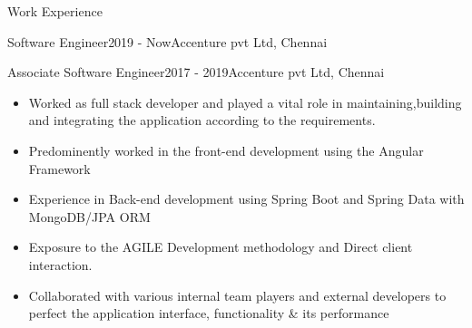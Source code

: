 \documentclass{resume} %
\begin{document}

\begin{rSection}{Work Experience}

\begin{rSubsection}{Software Engineer}{2019 - Now}{Accenture pvt Ltd, Chennai}{}
\end{rSubsection}
\begin{rSubsection}{Associate Software Engineer}{2017 - 2019}{Accenture pvt Ltd, Chennai}{}
\end{rSubsection}
\begin{itemize}
    \item Worked as full stack developer and played a vital role in maintaining,building and integrating the application according to the requirements.
    \item Predominently worked in the front-end development using the Angular Framework
    \item Experience in Back-end development using Spring Boot and Spring Data with MongoDB/JPA ORM
    \item Exposure to the AGILE Development methodology and Direct client interaction.
    \item Collaborated with various internal team players and external developers to perfect the application interface, functionality \& its performance
\end{itemize}

\end{rSection}
\end{document}

